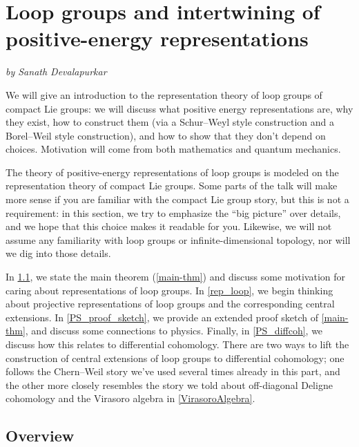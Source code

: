 
\section{Loop groups and intertwining of positive-energy representations}
\textit{by Sanath Devalapurkar}
\label{loop_groups}

We will give an introduction to the representation theory of loop groups of
compact Lie groups: we will discuss what positive energy representations
are, why they exist, how to construct them (via a Schur--Weyl style
construction and a Borel--Weil style construction), and how to show that they
don't depend on choices. Motivation will come from both mathematics and
quantum mechanics.

The theory of positive-energy representations of loop groups is modeled
on the representation theory of compact Lie groups. Some parts of the talk will make more sense if you are familiar
with the compact Lie group story, but this is not a requirement: in this section, we try to emphasize the ``big
picture'' over details, and we hope that this choice makes it readable for you. Likewise, we will not assume any
familiarity with loop groups or infinite-dimensional topology, nor will we dig into those details.

In \cref{ssec_loop_overview}, we state the main theorem (\cref{main-thm}) and discuss some motivation for caring
about representations of loop groups. In \cref{rep_loop}, we begin thinking about projective representations of
loop groups and the corresponding central extensions. In \cref{PS_proof_sketch}, we provide an extended proof
sketch of \cref{main-thm}, and discuss some connections to physics. Finally, in \cref{PS_diffcoh}, we discuss how
this relates to differential cohomology. There are two ways to lift the construction of central extensions of loop
groups to differential cohomology; one follows the Chern--Weil story we've used several times already in this part,
and the other more closely resembles the story we told about off-diagonal Deligne cohomology and the Virasoro
algebra in \cref{VirasoroAlgebra}.


\subsection{Overview}
\label{ssec_loop_overview}

